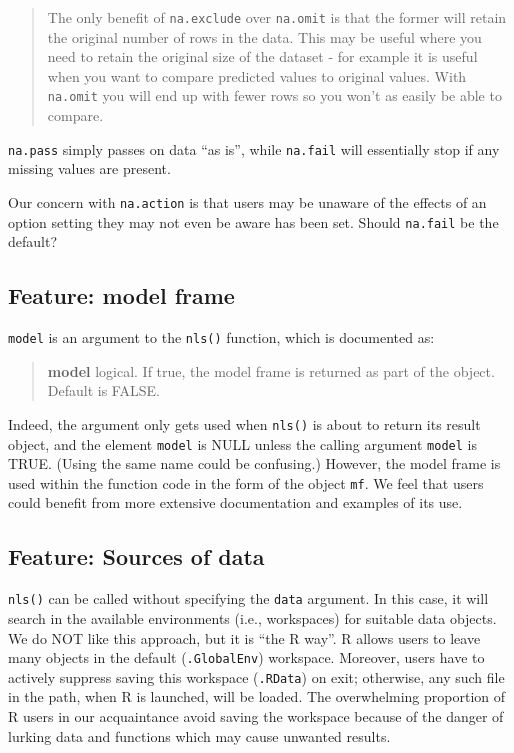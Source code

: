 \begin{quote}
The only benefit of \texttt{na.exclude} over \texttt{na.omit} is that the former will retain the
original number of rows in the data. This may be useful where you need to retain the
original size of the dataset - for example it is useful when you want to compare
predicted values to original values. With \texttt{na.omit} you will end up with fewer
rows so you won't as easily be able to compare.
\end{quote}

\texttt{na.pass} simply passes on data ``as is'', while \texttt{na.fail} will essentially stop
if any missing values are present.

Our concern with \texttt{na.action} is that users may be unaware of the effects of an option
setting they may not even be aware has been set. Should \texttt{na.fail} be the default?

\hypertarget{feature-model-frame}{%
\subsection{Feature: model frame}\label{feature-model-frame}}

\texttt{model} is an argument to the \texttt{nls()} function, which is documented as:

\begin{quote}
\textbf{model} logical. If true, the model frame is returned as part of the object. Default is FALSE.
\end{quote}

Indeed, the argument only gets used when \texttt{nls()} is about to return its result
object, and the element \texttt{model} is NULL unless the calling argument \texttt{model} is
TRUE. (Using the same name could be confusing.) However, the model frame is
used within the function code in the form of the object \texttt{mf}. We feel that
users could benefit from more extensive documentation and examples of its use.

\hypertarget{feature-sources-of-data}{%
\subsection{Feature: Sources of data}\label{feature-sources-of-data}}

\texttt{nls()} can be called without specifying the \texttt{data} argument. In this case, it will
search in the available environments (i.e., workspaces) for suitable data objects.
We do NOT like this approach, but it is ``the R way''. R allows users to leave many
objects in the default (\texttt{.GlobalEnv}) workspace. Moreover, users have to actively
suppress saving this workspace (\texttt{.RData}) on exit; otherwise, any such file in the
path, when R is launched, will be loaded. The overwhelming proportion of R users
in our acquaintance avoid saving the workspace because of the danger of lurking
data and functions which may cause unwanted results.

